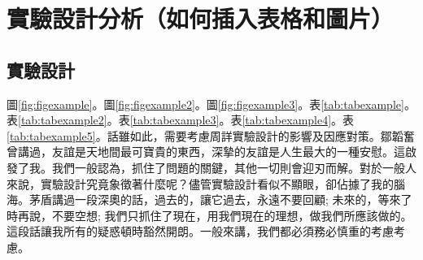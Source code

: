 
\chapter{實驗設計分析\small{（如何插入表格和圖片）}}\label{sec:evalutaion}

\section{實驗設計}

圖\ref{fig:figexample}。圖\ref{fig:figexample2}。圖\ref{fig:figexample3}。表\ref{tab:tabexample}。表\ref{tab:tabexample2}。表\ref{tab:tabexample3}。表\ref{tab:tabexample4}。表\ref{tab:tabexample5}。話雖如此，需要考慮周詳實驗設計的影響及因應對策。鄒韜奮曾講過，友誼是天地間最可寶貴的東西，深摯的友誼是人生最大的一種安慰。這啟發了我。我們一般認為，抓住了問題的關鍵，其他一切則會迎刃而解。對於一般人來說，實驗設計究竟象徵著什麼呢？儘管實驗設計看似不顯眼，卻佔據了我的腦海。茅盾講過一段深奧的話，過去的，讓它過去，永遠不要回顧; 未來的，等來了時再說，不要空想; 我們只抓住了現在，用我們現在的理想，做我們所應該做的。這段話讓我所有的疑惑頓時豁然開朗。一般來講，我們都必須務必慎重的考慮考慮。

